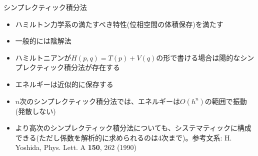 \begin{frame}[t,fragile]{シンプレクティック積分法}
  \begin{itemize}
  \item ハミルトン力学系の満たすべき特性(位相空間の体積保存)を満たす
  \item 一般的には陰解法
  \item ハミルトニアンが$H(p,q) = T(p) + V(q)$の形で書ける場合は陽的なシンプレクティック積分法が存在する
  \item エネルギーは近似的に保存する
  \item $n$次のシンプレクティック積分法では、エネルギーは$O(h^n)$の範囲で振動(発散しない)
  \item より高次のシンプレクティック積分法についても、システマティックに構成できる(ただし係数を解析的に求められるのは4次まで)。参考文系: H. Yoshida, Phys. Lett. A {\bf 150}, 262 (1990)
  \end{itemize}
\end{frame}
